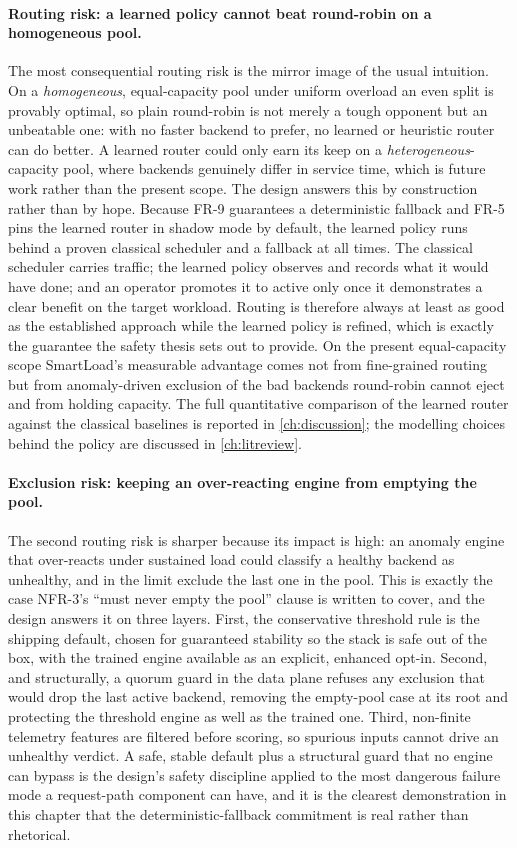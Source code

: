 \paragraph{Routing risk: a learned policy cannot beat round-robin on a homogeneous pool.}
The most consequential routing risk is the mirror image of the usual intuition. On a
\emph{homogeneous}, equal-capacity pool under uniform overload an even split is provably
optimal, so plain round-robin is not merely a tough opponent but an unbeatable one: with
no faster backend to prefer, no learned or heuristic router can do better. A learned
router could only earn its keep on a \emph{heterogeneous}-capacity pool, where backends
genuinely differ in service time, which is future work rather than the present scope. The
design answers this by construction rather than by hope. Because FR-9 guarantees a
deterministic fallback and FR-5 pins the learned router in shadow mode by default, the
learned policy runs behind a proven classical scheduler and a fallback at all times. The
classical scheduler carries traffic; the learned policy observes and records what it
would have done; and an operator promotes it to active only once it demonstrates a clear
benefit on the target workload. Routing is therefore always at least as good as the
established approach while the learned policy is refined, which is exactly the guarantee
the safety thesis sets out to provide. On the present equal-capacity scope SmartLoad's
measurable advantage comes not from fine-grained routing but from anomaly-driven
exclusion of the bad backends round-robin cannot eject and from holding capacity. The
full quantitative comparison of the learned router against the classical baselines is
reported in \cref{ch:discussion}; the modelling choices behind the policy are discussed
in \cref{ch:litreview}.

\paragraph{Exclusion risk: keeping an over-reacting engine from emptying the pool.}
The second routing risk is sharper because its impact is high: an anomaly engine that
over-reacts under sustained load could classify a healthy backend as unhealthy, and in
the limit exclude the last one in the pool. This is exactly the case NFR-3's ``must
never empty the pool'' clause is written to cover, and the design answers it on three
layers. First, the conservative threshold rule is the shipping default, chosen for
guaranteed stability so the stack is safe out of the box, with the trained engine
available as an explicit, enhanced opt-in. Second, and structurally, a quorum guard in
the data plane refuses any exclusion that would drop the last active backend, removing
the empty-pool case at its root and protecting the threshold engine as well as the
trained one. Third, non-finite telemetry features are filtered before scoring, so
spurious inputs cannot drive an unhealthy verdict. A safe, stable default plus a
structural guard that no engine can bypass is the design's safety discipline applied
to the most dangerous failure mode a request-path component can have, and it is the
clearest demonstration in this chapter that the deterministic-fallback commitment is
real rather than rhetorical.


